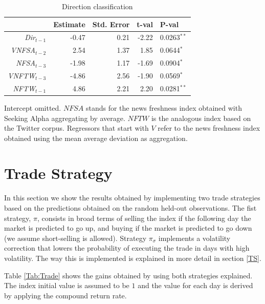 \documentclass[a4paper, 12pt]{report}
\begin{document}
\begin{table}
\centering
  \begin{threeparttable}
     \begin{tabular}{rrrrl}
     & \textbf{Estimate} & \textbf{Std. Error} & \textbf{t-val} & \textbf{P-val} \\ 
      \midrule
      \textit{Dir$_{t-1}$} & -0.47 & 0.21 & -2.22 & 0.0263$^{**}$ \\
      \textit{VNFSA$_{t-2}$} & 2.54 & 1.37 & 1.85 & 0.0644$^{*}$ \\ 
      \textit{NFSA$_{t-3}$} & -1.98 & 1.17 & -1.69 & 0.0904$^{*}$ \\ 
      \textit{VNFTW$_{t-3}$} & -4.86 & 2.56 & -1.90 & 0.0569$^{*}$ \\ 
      \textit{NFTW$_{t-1}$} & 4.86 & 2.21 & 2.20 & 0.0281$^{**}$ \\  
       \bottomrule
    \end{tabular}
    \begin{tablenotes}
      \footnotesize
      \item Intercept omitted. $NFSA$ stands for the news freshness index obtained with Seeking Alpha aggregating by average. $NFTW$ is the analogous index based on the Twitter corpus. Regressors that start with $V$ refer to the news freshness index obtained using the mean average deviation as aggregation.
    \end{tablenotes}
    \caption{Direction classification}
    \label{Tab:FreshnessDir}
  \end{threeparttable}
\end{table}

\section{Trade Strategy}

In this section we show the results obtained by implementing two trade strategies based on the predictions obtained on the random held-out observations. The fist strategy, $\pi$, consists in broad terms of selling the index if the following day the market is predicted to go up, and buying if the market is predicted to go down (we assume short-selling is allowed). Strategy $\pi_\sigma$ implements a volatility correction that lowers the probability of executing the trade in days with high volatility. The way this is implemented is explained in more detail in section \ref{TS}. 

Table \ref{Tab:Trade} shows the gains obtained by using both strategies explained. The index initial value is assumed to be $1$ and the value for each day is derived by applying the compound return rate. 
\end{document}
